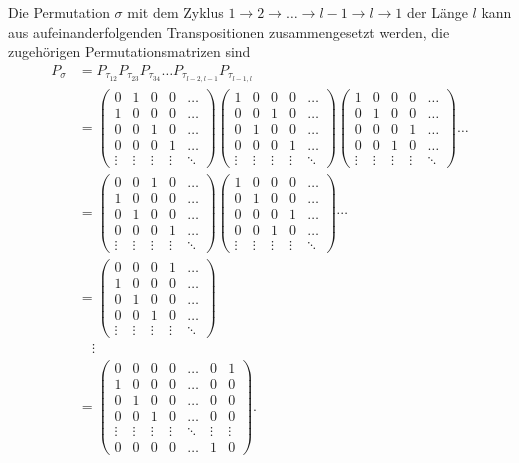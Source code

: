 Die Permutation $\sigma$ mit dem Zyklus $1\to 2\to\dots\to l-1\to l\to 1$
der Länge $l$ kann aus aufeinanderfolgenden Transpositionen zusammengesetzt
werden, die zugehörigen Permutationsmatrizen sind
\begin{align*}
P_\sigma
&=
P_{\tau_{12}}
P_{\tau_{23}}
P_{\tau_{34}}\dots
P_{\tau_{l-2,l-1}}
P_{\tau_{l-1,l}}
\\
&=
\begin{pmatrix}
0&1&0&0&\dots\\
1&0&0&0&\dots\\
0&0&1&0&\dots\\
0&0&0&1&\dots\\
\vdots&\vdots&\vdots&\vdots&\ddots
\end{pmatrix}
\begin{pmatrix}
1&0&0&0&\dots\\
0&0&1&0&\dots\\
0&1&0&0&\dots\\
0&0&0&1&\dots\\
\vdots&\vdots&\vdots&\vdots&\ddots
\end{pmatrix}
\begin{pmatrix}
1&0&0&0&\dots\\
0&1&0&0&\dots\\
0&0&0&1&\dots\\
0&0&1&0&\dots\\
\vdots&\vdots&\vdots&\vdots&\ddots
\end{pmatrix}
\dots
\\
&=
\begin{pmatrix}
0&0&1&0&\dots\\
1&0&0&0&\dots\\
0&1&0&0&\dots\\
0&0&0&1&\dots\\
\vdots&\vdots&\vdots&\vdots&\ddots
\end{pmatrix}
\begin{pmatrix}
1&0&0&0&\dots\\
0&1&0&0&\dots\\
0&0&0&1&\dots\\
0&0&1&0&\dots\\
\vdots&\vdots&\vdots&\vdots&\ddots
\end{pmatrix}
\cdots
\\
&=
\begin{pmatrix}
0&0&0&1&\dots\\
1&0&0&0&\dots\\
0&1&0&0&\dots\\
0&0&1&0&\dots\\
\vdots&\vdots&\vdots&\vdots&\ddots
\end{pmatrix}
\\
&\quad\vdots\\
&=
\begin{pmatrix}
0&0&0&0&\dots&0&1\\
1&0&0&0&\dots&0&0\\
0&1&0&0&\dots&0&0\\
0&0&1&0&\dots&0&0\\
\vdots&\vdots&\vdots&\vdots&\ddots&\vdots&\vdots\\
0&0&0&0&\dots&1&0
\end{pmatrix}.
\end{align*}

